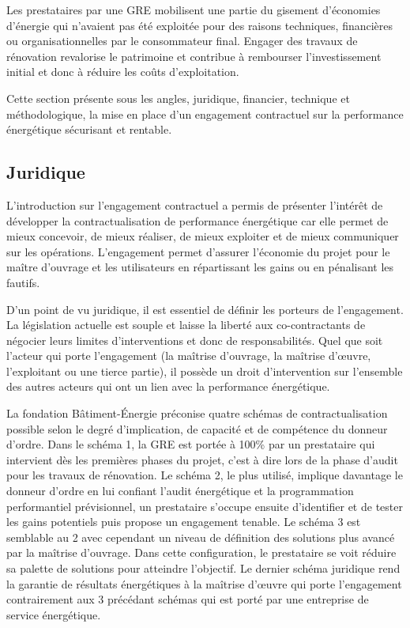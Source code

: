 Les prestataires par une GRE mobilisent une partie du gisement d'économies d'énergie qui n'avaient pas été exploitée pour des raisons techniques, financières ou organisationnelles par le consommateur final. Engager des travaux de rénovation revalorise le patrimoine et contribue à rembourser l'investissement initial et donc à réduire les coûts d'exploitation.

Cette section présente sous les angles, juridique, financier, technique et méthodologique, la mise en place d'un engagement contractuel sur la performance énergétique sécurisant et rentable.  

\subsection{Juridique}

L'introduction sur l'engagement contractuel a permis de présenter l'intérêt de développer la contractualisation de performance énergétique car elle permet de mieux concevoir, de mieux réaliser, de mieux exploiter et de mieux communiquer sur les opérations. L'engagement permet d'assurer l'économie du projet pour le maître d'ouvrage et les utilisateurs en répartissant les gains ou en pénalisant les fautifs. 

D'un point de vu juridique, il est essentiel de définir les porteurs de l'engagement. La législation actuelle est souple et laisse la liberté aux co-contractants de négocier leurs limites d'interventions et donc de responsabilités. Quel que soit l'acteur qui porte l'engagement (la maîtrise d'ouvrage, la maîtrise d'œuvre, l'exploitant ou une tierce partie), il possède un droit d'intervention sur l'ensemble des autres acteurs qui ont un lien avec la performance énergétique.

La fondation Bâtiment-Énergie \cite{FBE-16} préconise quatre schémas de contractualisation possible selon le degré d'implication, de capacité et de compétence du donneur d'ordre. Dans le schéma 1, la GRE est portée à 100\% par un prestataire qui intervient dès les premières phases du projet, c'est à dire lors de la phase d'audit pour les travaux de rénovation. Le schéma 2, le plus utilisé, implique davantage le donneur d'ordre en lui confiant l'audit énergétique et la programmation performantiel prévisionnel, un prestataire s'occupe ensuite d'identifier et de tester les gains potentiels puis propose un engagement tenable. Le schéma 3 est semblable au 2 avec cependant un niveau de définition des solutions plus avancé par la maîtrise d'ouvrage. Dans cette configuration, le prestataire se voit réduire sa palette de solutions pour atteindre l'objectif. Le dernier schéma juridique rend la garantie de résultats énergétiques à la maîtrise d'œuvre qui porte l'engagement contrairement aux 3 précédant schémas qui est porté par une entreprise de service énergétique. 

